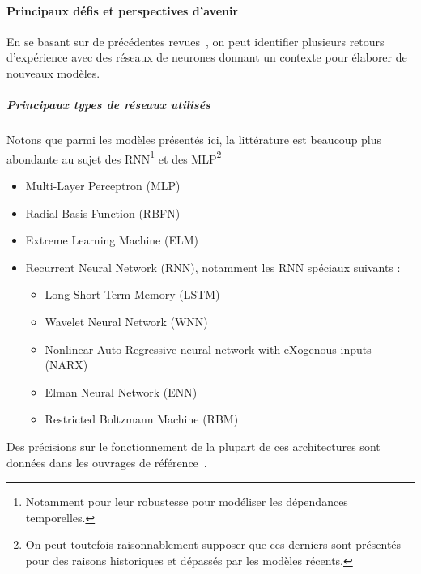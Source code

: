             \paragraph{Principaux défis et perspectives d'avenir}
                En se basant sur de précédentes revues~\cite{LU2022111718}, on peut identifier plusieurs
                retours d'expérience avec des réseaux de neurones donnant un contexte pour élaborer de
                nouveaux modèles.
                \subparagraph{Principaux types de réseaux utilisés}
                Notons que parmi les modèles présentés ici, la littérature est beaucoup plus
                abondante au sujet des RNN\footnote{Notamment pour leur robustesse pour modéliser les dépendances temporelles.} et des MLP\footnote{On peut toutefois raisonnablement supposer que ces derniers sont présentés pour des raisons historiques et dépassés par les modèles récents.}
                \begin{itemize}
                    \item Multi-Layer Perceptron (MLP)
                    \item Radial Basis Function (RBFN)
                    \item Extreme Learning Machine (ELM)
                    \item Recurrent Neural Network (RNN), notamment les RNN spéciaux
                    suivants :
                    \begin{itemize}
                        \item Long Short-Term Memory (LSTM)
                        \item Wavelet Neural Network (WNN)
                        \item Nonlinear Auto-Regressive neural network with eXogenous inputs (NARX)
                        \item Elman Neural Network (ENN)
                        \item Restricted Boltzmann Machine (RBM)
                    \end{itemize}
                \end{itemize}

                Des précisions sur le fonctionnement de la plupart de ces architectures sont
                données dans les ouvrages de référence~\cite{Goodfellow-et-al-2016, UDL}.

